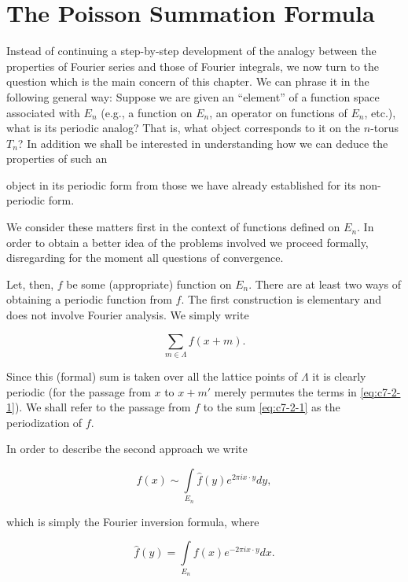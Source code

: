 \section{The Poisson Summation Formula}

Instead of continuing a step-by-step development of the analogy between the properties of Fourier series and those of Fourier integrals, we now turn to the question which is the main concern of this chapter. We can phrase it in the following general way: Suppose we are given an ``element'' of a function space associated with $E_n$ (e.g., a function on $E_n$, an operator on functions of $E_n$, etc.), what is its periodic analog? That is, what object corresponds to it on the $n$-torus $T_n$? In addition we shall be interested in understanding how we can deduce the properties of such an

object in its periodic form from those we have already established for its non-periodic form.

We consider these matters first in the context of functions defined on $E_{n}$. In order to obtain a better idea of the problems involved we proceed formally, disregarding for the moment all questions of convergence.

Let, then, $f$ be some (appropriate) function on $E_n$. There are at least two ways of obtaining a periodic function from $f$. The first construction is elementary and does not involve Fourier analysis. We simply write

\begin{equation}\label{eq:c7-2-1}
\sum_{m\in\Lambda}f(x+m).
\end{equation}

Since this (formal) sum is taken over all the lattice points of $\Lambda$ it is clearly periodic (for the passage from $x$ to $x + m'$ merely permutes the terms in \eqref{eq:c7-2-1}). We shall refer to the passage from $f$ to the sum \eqref{eq:c7-2-1} as the periodization of $f$.

In order to describe the second approach we write

\begin{equation}\label{eq:c7-2-2}
f(x)\sim\int\limits_{E_{n}}\hat{f}(y)e^{2\pi i x\cdot y}d y,
\end{equation}

which is simply the Fourier inversion formula, where

\[
\hat{f}(y)=\int\limits_{E_{n}}f(x)e^{-2\pi i x\cdot y}d x.
\]

